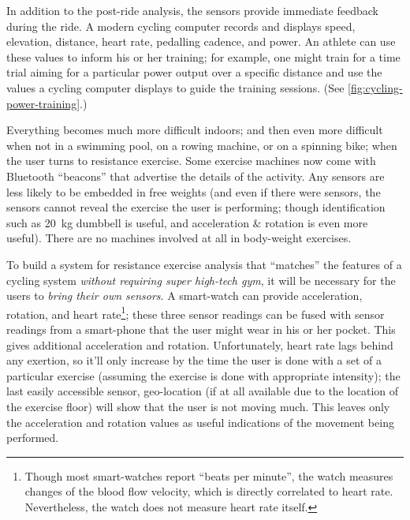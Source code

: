 
In addition to the post-ride analysis, the sensors provide immediate feedback during the ride. A modern cycling computer records and displays speed, elevation, distance, heart rate, pedalling cadence, and power. An athlete can use these values to inform his or her training; for example, one might train for a time trial aiming for a particular power output over a specific distance and use the values a cycling computer displays to guide the training sessions. (See \autoref{fig:cycling-power-training}.)


Everything becomes much more difficult indoors; and then even more difficult when not in a swimming pool, on a rowing machine, or on a spinning bike; when the user turns to resistance exercise. Some exercise machines now come with Bluetooth ``beacons'' that advertise the details of the activity. Any sensors are less likely to be embedded in free weights (and even if there were sensors, the sensors cannot reveal the exercise the user is performing; though identification such as \SI{20}{\kg} dumbbell is useful, and acceleration \& rotation is even more useful). There are no machines involved at all in body-weight exercises. 

To build a system for resistance exercise analysis that ``matches'' the features of a cycling system \emph{without requiring super high-tech gym}, it will be necessary for the users to \emph{bring their own sensors}. A smart-watch can provide acceleration, rotation, and heart rate\footnote{Though most smart-watches report ``beats per minute'', the watch measures changes of the blood flow velocity, which is directly correlated to heart rate. Nevertheless, the watch does not measure heart rate itself.}; these three sensor readings can be fused with sensor readings from a smart-phone that the user might wear in his or her pocket. This gives additional acceleration and rotation. Unfortunately, heart rate lags behind any exertion, so it'll only increase by the time the user is done with a set of a particular exercise (assuming the exercise is done with appropriate intensity); the last easily accessible sensor, geo-location (if at all available due to the location of the exercise floor) will show that the user is not moving much. This leaves only the acceleration and rotation values as useful indications of the movement being performed. 

